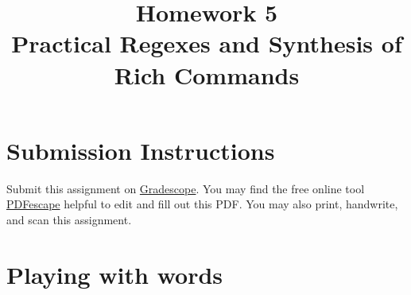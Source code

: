 \documentclass{article}
\begin{document}
\fancyhead[L]{}
\fancyhead[R]{}

\fancyfoot[C]{\color{gray} \thepage~/~\pageref*{LastPage}}
\pagestyle{fancyplain}

\title{\textbf{Homework 5\\Practical Regexes and Synthesis of Rich Commands}}
\author{\textbf{\color{red}{Due: Wednesday, October 16th, 11:59PM (Hard Deadline)}}}
\date{}
\maketitle


\section*{Submission Instructions}
Submit this assignment on \href{https://gradescope.com/courses/24368}{Gradescope}.
You may find the free online tool \href{https://www.pdfescape.com}{PDFescape}
helpful to edit and fill out this PDF.
You may also print, handwrite, and scan this assignment.


\section{Playing with words}
\end{document}
